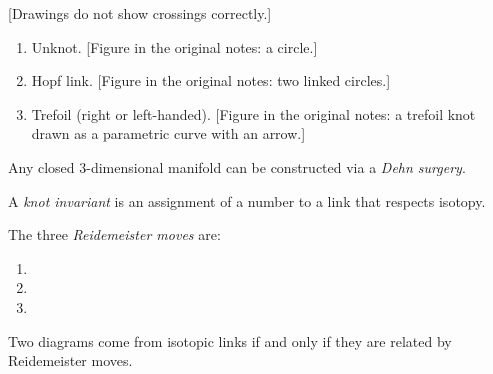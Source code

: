 \begin{example}
\label{example-l3-links}
[Drawings do not show crossings
correctly.]
\begin{enumerate}
\item Unknot. [Figure in the original
notes: a circle.]
\item Hopf link. [Figure in the original
notes: two linked circles.]
\item Trefoil (right or left-handed).
[Figure in the original notes: a trefoil
knot drawn as a parametric curve with an
arrow.]
\end{enumerate}
\end{example}

\begin{theorem}
\label{theorem-l3-lickorish-wallace}
Any closed 3-dimensional manifold can be
constructed via a {\it Dehn surgery}.
\end{theorem}

\begin{definition}
\label{definition-l3-knot-invariant}
A {\it knot invariant} is an assignment of
a number to a link that respects isotopy.
\end{definition}

\begin{theorem}
\label{theorem-l3-reidemeister}
The three {\it Reidemeister moves} are:
\begin{enumerate}
\item[(R1)] [no pictures...]
\item[(R2)]
\item[(R3)]
\end{enumerate}
Two diagrams come from isotopic links if
and only if they are related by
Reidemeister moves.
\end{theorem}

